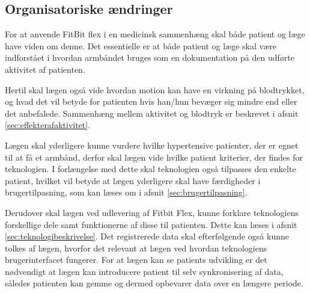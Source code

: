 \subsection{Organisatoriske ændringer}

For at anvende FitBit flex i en medicinsk sammenhæng skal både patient og læge have viden om denne. Det essentielle er at både patient og læge skal være indforstået i hvordan armbåndet bruges som en dokumentation på den udførte aktivitet af patienten. 


Hertil skal lægen også vide hvordan motion kan have en virkning på blodtrykket, og hvad det vil betyde for patienten hvis han/hun bevæger sig mindre end eller det anbefalede. Sammenhæng mellem aktivitet og blodtryk er beskrevet i afsnit \ref{sec:effekterafaktivitet}.


Lægen skal yderligere kunne vurdere hvilke hypertensive patienter, der er egnet til at få et armbånd, derfor skal lægen vide hvilke patient kriterier, der findes for teknologien. I forlængelse med dette skal teknologien også tilpasses den enkelte patient, hvilket vil betyde at lægen yderligere skal have færdigheder i brugertilpasning, som kan læses om i afsnit \ref{sec:brugertilpasning}. 


Derudover skal lægen ved udlevering af Fitbit Flex, kunne forklare teknologiens forskellige dele samt funktionerne af disse til patienten. Dette kan læses i afsnit \ref{sec:teknologibeskrivelse}. Det registrerede data skal efterfølgende også kunne tolkes af lægen, hvorfor det relevant at lægen ved hvordan teknologiens brugerinterfacet fungerer. For at lægen kan se patients udvikling er det nødvendigt at lægen kan introducere patient til selv synkronisering af data, således patienten kan gemme og dermed opbevarer data over en længere periode. 